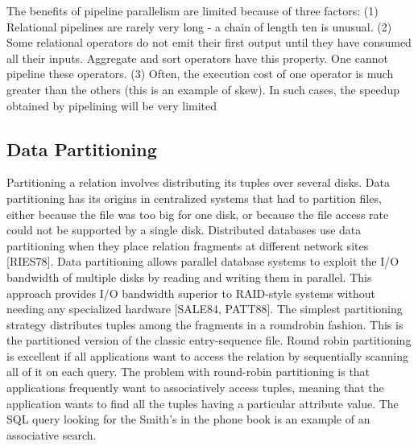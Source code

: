 \documentclass[10pt,twocolumn]{IEEEtran11}
\begin{document}
The benefits of pipeline parallelism are limited because of three factors: (1) Relational
pipelines are rarely very long - a chain of length ten is unusual. (2) Some relational operators do
not emit their first output until they have consumed all their inputs. Aggregate and sort operators
have this property. One cannot pipeline these operators. (3) Often, the execution cost of one
operator is much greater than the others (this is an example of skew). In such cases, the speedup
obtained by pipelining will be very limited

\subsection{Data Partitioning}

Partitioning a relation involves distributing its tuples over several disks. Data partitioning
has its origins in centralized systems that had to partition files, either because the file was too big
for one disk, or because the file access rate could not be supported by a single disk. Distributed
databases use data partitioning when they place relation fragments at different network sites
[RIES78]. Data partitioning allows parallel database systems to exploit the I/O bandwidth of
multiple disks by reading and writing them in parallel. This approach provides I/O bandwidth
superior to RAID-style systems without needing any specialized hardware [SALE84, PATT88].
The simplest partitioning strategy distributes tuples among the fragments in a roundrobin
fashion. This is the partitioned version of the classic entry-sequence file. Round robin
partitioning is excellent if all applications want to access the relation by sequentially scanning all
of it on each query. The problem with round-robin partitioning is that applications frequently
want to associatively access tuples, meaning that the application wants to find all the tuples
having a particular attribute value. The SQL query looking for the Smith's in the phone book is
an example of an associative search.
\end{document}
